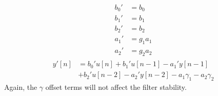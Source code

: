 \documentclass[twoside,a4paper]{article}
\begin{document}
%
\begin{align}
    \begin{split}
        b_0' &= b_0\\
        b_1' &= b_1\\
        b_2' &= b_2\\
        a_1' &= g_1 a_1\\
        a_2' &= g_2 a_2
    \end{split}
        \label{eq:bq2_coefs_re-write}
\end{align}
%
\begin{equation}
    \begin{split}
        y'[n] &= b_0' u[n]
        + b_1' u[n-1] - a_1' y[n-1] \\
        & + b_2' u[n-2] - a_2' y[n-2]
        - a_1\gamma_1 - a_2\gamma_2
    \end{split}
        \label{eq:nlbq2_re-write2}
\end{equation}
%
Again, the $\gamma$ offset terms will not affect the filter stability.
\end{document}

